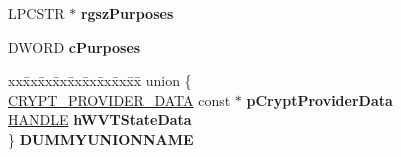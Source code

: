 \begin{DoxyCompactItemize}
\item 
\mbox{\label{structtag_c_r_y_p_t_u_i___v_i_e_w_c_e_r_t_i_f_i_c_a_t_e___s_t_r_u_c_t_w_ad91a0e0bb044e8e6aec08c1d5dd1cb61}} 
L\+P\+C\+S\+TR $\ast$ {\bfseries rgsz\+Purposes}
\item 
\mbox{\label{structtag_c_r_y_p_t_u_i___v_i_e_w_c_e_r_t_i_f_i_c_a_t_e___s_t_r_u_c_t_w_a220dea4f3eb050beb2549d871308ce32}} 
D\+W\+O\+RD {\bfseries c\+Purposes}
\item 
\mbox{\label{structtag_c_r_y_p_t_u_i___v_i_e_w_c_e_r_t_i_f_i_c_a_t_e___s_t_r_u_c_t_w_a45482f231ead30e1e363ae5fa7d1f677}} 
\begin{tabbing}
xx\=xx\=xx\=xx\=xx\=xx\=xx\=xx\=xx\=\kill
union \{\\
\>\hyperlink{struct___c_r_y_p_t___p_r_o_v_i_d_e_r___d_a_t_a}{CRYPT\_PROVIDER\_DATA} const  $\ast$ {\bfseries pCryptProviderData}\\
\>\hyperlink{interfacevoid}{HANDLE} {\bfseries hWVTStateData}\\
\} {\bfseries DUMMYUNIONNAME}\\


\end{tabbing}
\end{DoxyCompactItemize}
